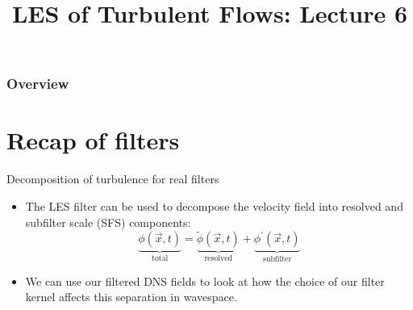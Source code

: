 
\title{LES of Turbulent Flows: Lecture 6}




\begin{frame} 
  \titlepage
\end{frame}


\begin{frame}
\frametitle{Overview}
\tableofcontents
\end{frame}

\section{Recap of filters} %
\begin{frame}{Decomposition of turbulence for real filters}

\begin{itemize}
	\item The LES filter can be used to decompose the velocity field into resolved and subfilter scale (SFS) components:
	$$\underbrace{\phi(\vec{x},t)}_{\text{total}} = \underbrace{\tilde \phi (\vec{x},t)}_{\text{resolved}} + \underbrace{\phi^{\prime}(\vec{x},t)}_{\text{subfilter}}$$
	\item We can use our filtered DNS fields to look at how the choice of our filter kernel affects this separation in wavespace.
\end{itemize}
\end{frame}


